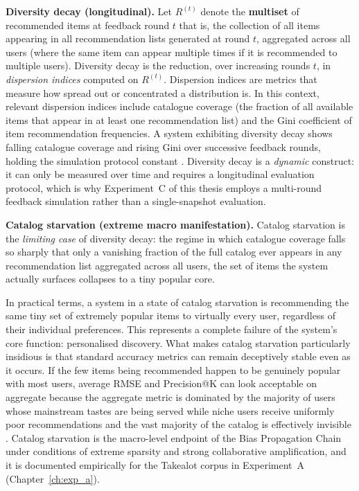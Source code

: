 \documentclass[11pt,a4paper]{report}
\begin{document}
\textbf{Diversity decay (longitudinal).}
Let $R^{(t)}$ denote the \textbf{multiset} of recommended items at feedback round $t$ that is, the collection of all items appearing in all recommendation lists generated at round $t$, aggregated across all users (where the same item can appear multiple times if it is recommended to multiple users). Diversity decay is the reduction, over increasing rounds $t$, in \emph{dispersion indices} computed on $R^{(t)}$. Dispersion indices are metrics that measure how spread out or concentrated a distribution is. In this context, relevant dispersion indices include catalogue coverage (the fraction of all available items that appear in at least one recommendation list) and the Gini coefficient of item recommendation frequencies. A system exhibiting diversity decay shows falling catalogue coverage and rising Gini over successive feedback rounds, holding the simulation protocol constant \citep{mansoury2020feedback, chaney2018algorithmic}. Diversity decay is a \emph{dynamic} construct: it can only be measured over time and requires a longitudinal evaluation protocol, which is why Experiment~C of this thesis employs a multi-round feedback simulation rather than a single-snapshot evaluation.

\textbf{Catalog starvation (extreme macro manifestation).}
Catalog starvation is the \emph{limiting case} of diversity decay: the regime in which catalogue coverage falls so sharply that only a vanishing fraction of the full catalog ever appears in any recommendation list aggregated across all users, the set of items the system actually surfaces collapses to a tiny popular core.

In practical terms, a system in a state of catalog starvation is recommending the same tiny set of extremely popular items to virtually every user, regardless of their individual preferences. This represents a complete failure of the system's core function: personalised discovery. What makes catalog starvation particularly insidious is that standard accuracy metrics can remain deceptively stable even as it occurs. If the few items being recommended happen to be genuinely popular with most users, average RMSE and Precision@K can look acceptable on aggregate because the aggregate metric is dominated by the majority of users whose mainstream tastes are being served while niche users receive uniformly poor recommendations and the vast majority of the catalog is effectively invisible \citep{steck2011itempopularity}. Catalog starvation is the macro-level endpoint of the Bias Propagation Chain under conditions of extreme sparsity and strong collaborative amplification, and it is documented empirically for the Takealot corpus in Experiment~A (Chapter~\ref{ch:exp_a}).
\end{document}
